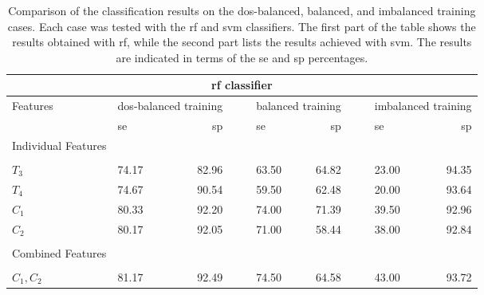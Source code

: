\begin{table}
	\caption[Results of Experiment~\#2 - comparison of the three cases]{Comparison of the classification results on the \ac{dos}-balanced, balanced, and imbalanced training cases.
	Each case was tested with the \ac{rf} and \ac{svm} classifiers. 
	The first part of the table shows the results obtained with \ac{rf}, while the second part lists the results achieved with \ac{svm}.
	The results are indicated in terms of the \acf{se} and \acf{sp} percentages.}
	\label{tab:threecasecomExp2}
	\medskip		
	\footnotesize{
	\begin{center}
	\begin{tabularx}{0.95\textwidth}{@{}l	lllr	 ll	lllr	 ll lllr @{}}
	\toprule
	\multicolumn{17}{c}{ \ac{rf} classifier}\\
	\midrule
	Features & \multicolumn{4}{l}{\ac{dos}-balanced training} & & & \multicolumn{4}{l}{balanced training} & & & \multicolumn{4}{l}{imbalanced training} \\
	\cmidrule{2-5} \cmidrule{8-11} \cmidrule{14-17}
	& \ac{se} & & & \ac{sp} & & &  \ac{se} & & & \ac{sp} & & & \ac{se} & & & \ac{sp} \\
	\cmidrule{2-17}
	Individual Features\\
	\multicolumn{11}{l}{}\\[-2ex]
 $T_3$ & \cellcolor[gray]{0.8}74.17	&\cellcolor[gray]{0.8} &\cellcolor[gray]{0.8} & \cellcolor[gray]{0.8}82.96	 & & & 63.50	 & & & 64.82 & & & 23.00	& & & 94.35 \\
 $T_4$ & \cellcolor[gray]{0.8}74.67	&\cellcolor[gray]{0.8} &\cellcolor[gray]{0.8} & \cellcolor[gray]{0.8}90.54 & & & 59.50	 & & & 62.48 & & & 20.00	& & & 93.64 \\
 $C_1$ & \cellcolor[gray]{0.8}80.33	&\cellcolor[gray]{0.8} &\cellcolor[gray]{0.8} & \cellcolor[gray]{0.8}92.20 & & & 74.00 & & & 71.39 & & & 39.50 & & & 92.96 \\
 $C_2$ & \cellcolor[gray]{0.8}80.17	&\cellcolor[gray]{0.8} &\cellcolor[gray]{0.8} & \cellcolor[gray]{0.8}92.05	 & & & 71.00 & & & 58.44 & & & 38.00 & & & 92.84 \\
 	\multicolumn{17}{l}{}\\
	Combined Features\\
	\multicolumn{17}{l}{}\\[-2ex]
$C_1,C_2	$					& \cellcolor[gray]{0.8}81.17 &\cellcolor[gray]{0.8} &\cellcolor[gray]{0.8} & \cellcolor[gray]{0.8}92.49 & & & 74.50 & & & 64.58 & & & 43.00	 & & & 93.72\\

\end{tabularx}
\end{center}}
\end{table}
